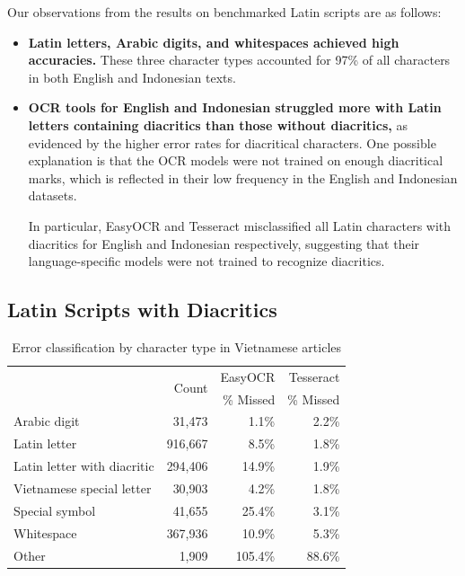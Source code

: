 \documentclass[12pt,oneside]{memoir}
\begin{document}
Our observations from the results on benchmarked Latin scripts are as follows:

\begin{itemize}
    \item \textbf{Latin letters, Arabic digits, and whitespaces achieved high accuracies.} These three character types accounted for 97\% of all characters in both English and Indonesian texts.
    \item \textbf{OCR tools for English and Indonesian struggled more with Latin letters containing diacritics than those without diacritics,} as evidenced by the higher error rates for diacritical characters.
    One possible explanation is that the OCR models were not trained on enough diacritical marks, which is reflected in their low frequency in the English and Indonesian datasets.

    In particular, EasyOCR and Tesseract misclassified all Latin characters with diacritics for English and Indonesian respectively, suggesting that their language-specific models were not trained to recognize diacritics.
\end{itemize}

\subsection{Latin Scripts with Diacritics}

\begin{table}[ht]
    \caption{Error classification by character type in Vietnamese articles}
    \label{table:error-classification-vietnamese}
    \centering
    \begin{tabular}{lrrr}
        \toprule
        & \multirow{2}{*}{Count} & EasyOCR & Tesseract\\
        & & \% Missed & \% Missed\\
        \midrule
        Arabic digit & 31,473 & \cellcolor{LightRed!1}1.1\% & \cellcolor{LightRed!2}2.2\% \\
        Latin letter & 916,667 & \cellcolor{LightRed!8}8.5\% & \cellcolor{LightRed!2}1.8\% \\
        Latin letter with diacritic & 294,406 & \cellcolor{LightRed!15}14.9\% & \cellcolor{LightRed!2}1.9\% \\
        Vietnamese special letter & 30,903 & \cellcolor{LightRed!4}4.2\% & \cellcolor{LightRed!2}1.8\% \\
        Special symbol & 41,655 & \cellcolor{LightRed!25}25.4\% & \cellcolor{LightRed!3}3.1\% \\
        Whitespace & 367,936 & \cellcolor{LightRed!11}10.9\% & \cellcolor{LightRed!5}5.3\% \\
        Other & 1,909 & \cellcolor{LightRed!105}105.4\% & \cellcolor{LightRed!89}88.6\% \\
        \bottomrule
    \end{tabular}
\end{table}
\end{document}
